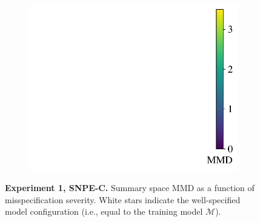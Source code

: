 \documentclass[twoside,11pt]{article}
\newcommand{\numberGaussianMeans}{1}
\newcommand{\0}{\boldsymbol{0}}
\newcommand{\M}{\mathcal{M}}
\begin{document}
\begin{figure}[t]
\begin{subfigure}[c]{0.9\linewidth}
\begin{tabular}{ccccc}
    \end{tabular}%
    \end{subfigure}%
    \begin{subfigure}[c]{0.06\linewidth}
    \includegraphics[width=\linewidth, clip, trim=9.8cm 0cm 0.2cm 0cm]{plots/abf_mvn_means_mmd_heatmaps_colorbar.pdf}%
    \end{subfigure}
    \caption{\textbf{Experiment \numberGaussianMeans, SNPE-C.} Summary space MMD as a function of misspecification severity. White stars indicate the well-specified model configuration (i.e., equal to the training model $\M$).}
\end{figure}


\end{document}
